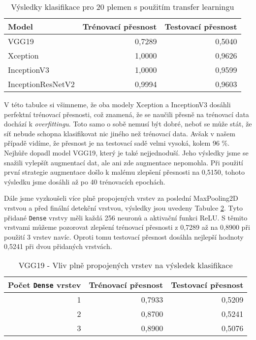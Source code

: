 \documentclass[a4paper,12pt]{article}
\begin{document}
\begin{table}[h!]
    \centering
    \begin{tabular}{l | r | r}
    \toprule
    Model               & Trénovací přesnost    & Testovací přesnost  \\\midrule
    VGG19               & 0,7289                & 0,5040              \\
    Xception            & 1,0000                & 0,9626              \\
    InceptionV3         & 1,0000                & 0,9599              \\
    InceptionResNetV2   & 0,9994                & 0,9603              \\
    \bottomrule
    \end{tabular}
    \caption{Výsledky klasifikace pro 20 plemen s použitím transfer learningu}
    \label{tab:transfered_t20_results}
\end{table}

V této tabulce si všimneme, že oba modely Xception a InceptionV3 dosáhli perfektní trénovací přesnosti, což znamená, že se naučili přesně na trénovací data dochází k \emph{overfittingu}. 
Toto samo o sobě nemusí být dobré, neboť se může stát, že síť nebude schopna klasifikovat nic jiného než trénovací data. Avšak v našem případě vidíme, že přesnost je na testovací sadě velmi vysoká, 
kolem 96 \%. Nejhůře dopadl model VGG19, který je také nejjednoduší. Jeho výsledky jsme se snažili vylepšít augmentací dat, ale ani zde augmentace nepomohla. Při použití první strategie augmentace došlo
k malému zlepšení přesnosti na 0,5150, tohoto výsledku jsme dosáhli až po 40 trénovacích epochách.

Dále jsme vyzkoušeli více plně propojených vrstev za poslední MaxPooling2D vrstvou a před finální detekční vrstvou, výsledky jsou uvedeny Tabulce \ref{tab:vgg19_dense_test}. 
Tyto přidané \texttt{Dense} vrstvy měli každá 256 neuronů a aktivační funkci ReLU. S těmito vrstvami můžeme pozorovat zlepšení trénovací přesnosti z 0,7289 až na 0,8900 při použití 3 vrstev navíc. 
Oproti tomu testovací přesnost dosáhla nejlepší hodnoty 0,5241 při dvou přidaných vrstvách. 


\begin{table}[h!]
    \centering
    \begin{tabular}{r | r | r}
    \toprule
    Počet \texttt{Dense} vrstev & Trénovací přesnost    & Testovací přesnost  \\\midrule
    1                           & 0,7933                & 0,5209              \\
    2                           & 0,8700                & 0,5241              \\
    3                           & 0,8900                & 0,5076              \\
    \bottomrule
    \end{tabular}
    \caption{VGG19 - Vliv plně propojených vrstev na výsledek klasifikace}
    \label{tab:vgg19_dense_test}
\end{table}





\end{document}
